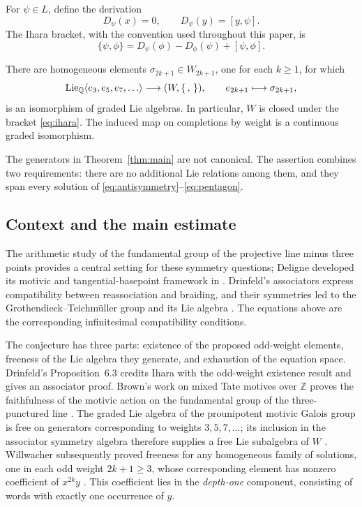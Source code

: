 For \(\psi\in L\), define the derivation
\begin{equation}\label{eq:ihara-derivation}
 D_\psi(x)=0,\qquad D_\psi(y)=[y,\psi].
\end{equation}
The Ihara bracket, with the convention used throughout this paper, is
\begin{equation}\label{eq:ihara}
 \{\psi,\phi\}=D_\psi(\phi)-D_\phi(\psi)+[\psi,\phi].
\end{equation}

\begin{theorem}\label{thm:main}
There are homogeneous elements
\(\sigma_{2k+1}\in W_{2k+1}\), one for each \(k\ge1\), for which
\[
 \operatorname{Lie}_{\mathbb Q}\langle e_3,e_5,e_7,\ldots\rangle
 \longrightarrow (W,\{\, ,\,\}),\qquad
 e_{2k+1}\longmapsto\sigma_{2k+1},
\]
is an isomorphism of graded Lie algebras.
In particular, \(W\) is closed under the bracket
\eqref{eq:ihara}.  The induced map on completions by weight is a
continuous graded isomorphism.
\end{theorem}

The generators in Theorem~\ref{thm:main} are not canonical.
The assertion combines two requirements: there are no additional Lie
relations among them, and they span every solution of
\eqref{eq:antisymmetry}--\eqref{eq:pentagon}.

\subsection{Context and the main estimate}
The arithmetic study of the fundamental group of the projective line
minus three points provides a central setting for these symmetry
questions; Deligne developed its motivic and tangential-basepoint
framework in \cite[Introduction and Section~15]{Deligne}.
Drinfeld's associators express compatibility between reassociation and
braiding, and their symmetries led to the
Grothendieck--Teichm\"uller group and its Lie algebra
\cite{Drinfeld}.  The equations above are the corresponding
infinitesimal compatibility conditions.

The conjecture has three parts: existence of the proposed odd-weight
elements, freeness of the Lie algebra they generate, and exhaustion of
the equation space.  Drinfeld's Proposition~6.3 credits Ihara with the
odd-weight existence result and gives an associator proof.
Brown's work on mixed Tate motives over \(\mathbb Z\) proves the
faithfulness of the motivic action on the fundamental group of the
three-punctured line \cite{Brown}.  The graded Lie algebra of the
prounipotent motivic Galois group is free on generators corresponding to weights
\(3,5,7,\ldots\); its inclusion in the associator symmetry algebra
therefore supplies a free Lie subalgebra of \(W\)
\cite[Section~1.4.2]{BrownDepth}.
Willwacher subsequently proved freeness for any homogeneous family of
solutions, one in each odd weight \(2k+1\ge3\), whose corresponding
element has nonzero coefficient of
\(x^{2k}y\) \cite[Theorem~1.2]{WillwacherFree}.
This coefficient lies in the \emph{depth-one} component, consisting of
words with exactly one occurrence of \(y\).

